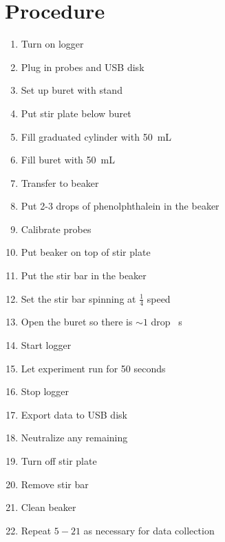 \documentclass[a4paper]{article}
\begin{document}
    \section{Procedure}
        \begin{enumerate}
            \item Turn on logger
            \item Plug in probes and USB disk
            \item Set up buret with stand
            \item Put stir plate below buret
            \item Fill graduated cylinder with \SI{50}{\mL} 
            \item Fill buret with \SI{50}{\mL} 
            \item Transfer  to beaker
            \item Put 2-3 drops of phenolphthalein in the beaker
            \item Calibrate probes
            \item Put beaker on top of stir plate
            \item Put the stir bar in the beaker
            \item Set the stir bar spinning at $\frac{1}{4}$ speed
            \item Open the buret so there is $\sim1$ drop \si{\per\second}
            \item Start logger
            \item Let experiment run for 50 seconds
            \item Stop logger
            \item Export data to USB disk
            \item Neutralize any remaining 
            \item Turn off stir plate
            \item Remove stir bar
            \item Clean beaker
            \item Repeat $5-21$ as necessary for data collection
        \end{enumerate}
\end{document}
